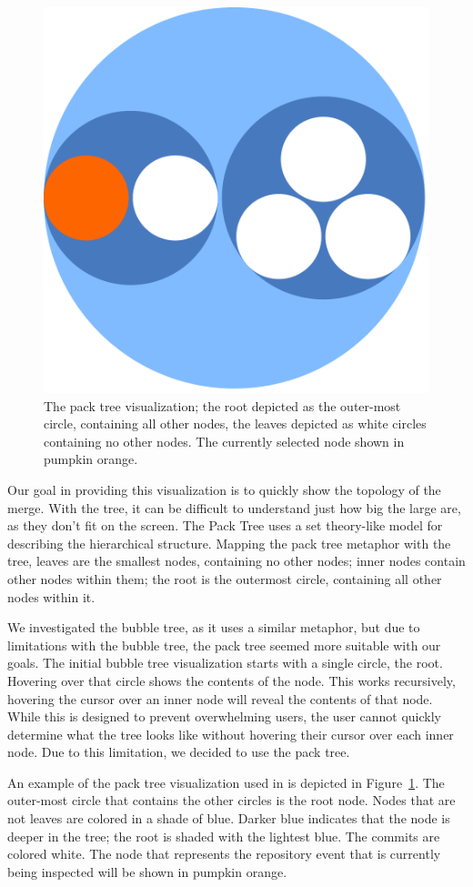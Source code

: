 \begin{figure}[htpb]
  \centering
  \includegraphics[width=0.4\linewidth]{Figures/Linvis/linvis_bubble.pdf}
  \caption{The pack tree visualization; the root depicted as the
    outer-most circle, containing all other nodes, the leaves depicted
    as white circles containing no other nodes. The currently selected
    node shown in pumpkin orange.}
  \label{fig:linvis_bubble_tree}
\end{figure}

Our goal in providing this visualization is to quickly show the topology
of the merge. With the \rt{} tree, it can be difficult to understand
just how big the large \mt{} are, as they don't fit on the screen. The
Pack Tree uses a set theory-like model for describing the hierarchical
structure. Mapping the pack tree metaphor with the tree, leaves are the
smallest nodes, containing no other nodes; inner nodes contain other
nodes within them; the root is the outermost circle, containing all
other nodes within it.

We investigated the bubble tree\cite{Boardman2000}, as it uses a similar
metaphor, but due to limitations with the bubble tree, the pack tree
seemed more suitable with our goals. The initial bubble tree
visualization starts with a single circle, the root. Hovering over that
circle shows the contents of the node. This works recursively, hovering
the cursor over an inner node will reveal the contents of that node.
While this is designed to prevent overwhelming users, the user cannot
quickly determine what the tree looks like without hovering their cursor
over each inner node. Due to this limitation, we decided to use the pack
tree.

An example of the pack tree visualization used in \tool{} is depicted in
Figure~\ref{fig:linvis_bubble_tree}. The outer-most circle that contains
the other circles is the root node. Nodes that are not leaves are
colored in a shade of blue. Darker blue indicates that the node is
deeper in the tree; the root is shaded with the lightest blue. The
commits are colored white. The node that represents the repository event
that is currently being inspected will be shown in pumpkin orange.
